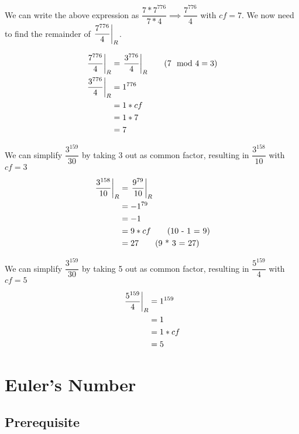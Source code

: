 
We can write the above expression as $\dfrac{7 * 7^{776}}{7 * 4} \implies \dfrac{7^{776}}{4} $ with $cf = 7$. We now need to find  the remainder of $\displaystyle{ \left. \frac{7^{776}}{4} \right |_{R} }$.

\begin{align*}
    \displaystyle{ \left. \frac{7^{776}}{4} \right |_{R} } &= \displaystyle{ \left. \frac{3^{776}}{4} \right |_{R} } \tag{$7 \mod 4 = 3$}\\
    \displaystyle{ \left. \frac{3^{776}}{4} \right |_{R} } &= 1^{776} \\
    &= 1 * cf \\
    &= 1 * 7 \\
    &= 7 \\
\end{align*}



We can simplify $\dfrac{3^{159}}{30}$ by taking 3 out as common factor, resulting in $\dfrac{3^{158}}{10}$ with $cf=3$

\begin{align*}
    \displaystyle{ \left. \frac{3^{158}}{10} \right |_{R} } &= \displaystyle{ \left. \frac{9^{79}}{10} \right |_{R} } \\
    &= -1^{79} \\
    &= -1 \\
    &= 9 * cf \tag{10 - 1 = 9} \\
    &= 27 \tag{9 * 3 = 27} 
\end{align*}


We can simplify $\dfrac{3^{159}}{30}$ by taking 5 out as common factor, resulting in $\dfrac{5^{159}}{4}$ with $cf=5$

\begin{align*}
    \displaystyle{ \left. \frac{5^{159}}{4} \right |_{R} } &= 1^{159} \\
    &= 1 \\
    &= 1 * cf \\
    &= 5 \\
\end{align*}

\section{Euler's Number}

\subsection{Prerequisite}


